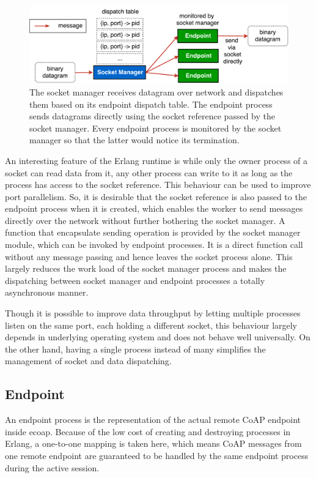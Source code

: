 \begin{figure}[!htbp]
\centering
\includegraphics[scale = 0.55]{coap_socket_manager}
\caption[The socket manager]{The socket manager receives datagram over network and dispatches them based on its endpoint dispatch table. The endpoint process sends datagrams directly using the socket reference passed by the socket manager. Every endpoint process is monitored by the socket manager so that the latter would notice its termination.}
\label{fig:coap_socket_manager}
\end{figure}

An interesting feature of the Erlang runtime is while only the owner process of a socket can read data from it, any other process can write to it as long as the process has access to the socket reference. This behaviour can be used to improve port parallelism. So, it is desirable that the socket reference is also passed to the endpoint process when it is created, which enables the worker to send messages directly over the network without further bothering the socket manager. A function that encapsulate sending operation is provided by the socket manager module, which can be invoked by endpoint processes. It is a direct function call without any message passing and hence leaves the socket process alone. This largely reduces the work load of the socket manager process and makes the dispatching between socket manager and endpoint processes a totally asynchronous manner.

Though it is possible to improve data throughput by letting multiple processes listen on the same port, each holding a different socket, this behaviour largely depends in underlying operating system and does not behave well universally. On the other hand, having a single process instead of many simplifies the management of socket and data dispatching.

\subsection{Endpoint}\label{coap_endpoint}

An endpoint process is the representation of the actual remote CoAP endpoint inside ecoap. Because of the low cost of creating and destroying processes in Erlang, a one-to-one mapping is taken here, which means CoAP messages from one remote endpoint are guaranteed to be handled by the same endpoint process during the active session.


